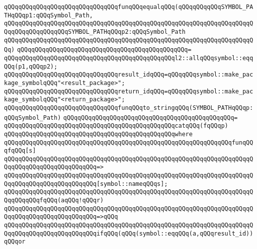 \newline
\verb|qQQqqQQqqQQqqQQqqQQqqQQqqQQqqQQqfunqQQqequalqQQq(qQQqqQQqqQQqSYMBOL_PATHqQQqp1:qQQqSymbol_Path,|\newline
\verb|qQQqqQQqqQQqqQQqqQQqqQQqqQQqqQQqqQQqqQQqqQQqqQQqqQQqqQQqqQQqqQQqqQQqqQQqqQQqqQQqqQQqqQQqSYMBOL_PATHqQQqp2:qQQqSymbol_Path|\newline
\verb|qQQqqQQqqQQqqQQqqQQqqQQqqQQqqQQqqQQqqQQqqQQqqQQqqQQqqQQqqQQqqQQqqQQqqQQq)|\newline
\verb|qQQqqQQqqQQqqQQqqQQqqQQqqQQqqQQqqQQqqQQqqQQqqQQq=|\newline
\verb|qQQqqQQqqQQqqQQqqQQqqQQqqQQqqQQqqQQqqQQqqQQqqQQql2::allqQQqsymbol::eqqQQq(p1,qQQqp2);|\newline
\newline
\verb|qQQqqQQqqQQqqQQqqQQqqQQqqQQqqQQqresult_idqQQq=qQQqqQQqsymbol::make_package_symbolqQQq"<result_package>";|\newline
\verb|qQQqqQQqqQQqqQQqqQQqqQQqqQQqqQQqreturn_idqQQq=qQQqqQQqsymbol::make_package_symbolqQQq"<return_package>";|\newline
\newline
\verb|qQQqqQQqqQQqqQQqqQQqqQQqqQQqqQQqfunqQQqto_stringqQQq(SYMBOL_PATHqQQqp:qQQqSymbol_Path)|\newline
\verb|qQQqqQQqqQQqqQQqqQQqqQQqqQQqqQQqqQQqqQQqqQQqqQQq=|\newline
\verb|qQQqqQQqqQQqqQQqqQQqqQQqqQQqqQQqqQQqqQQqqQQqqQQqcatqQQq(fqQQqp)|\newline
\verb|qQQqqQQqqQQqqQQqqQQqqQQqqQQqqQQqqQQqqQQqqQQqqQQqwhere|\newline
\verb|qQQqqQQqqQQqqQQqqQQqqQQqqQQqqQQqqQQqqQQqqQQqqQQqqQQqqQQqqQQqqQQqfunqQQqfqQQq[s]|\newline
\verb|qQQqqQQqqQQqqQQqqQQqqQQqqQQqqQQqqQQqqQQqqQQqqQQqqQQqqQQqqQQqqQQqqQQqqQQqqQQqqQQqqQQqqQQqqQQqqQQq=>|\newline
\verb|qQQqqQQqqQQqqQQqqQQqqQQqqQQqqQQqqQQqqQQqqQQqqQQqqQQqqQQqqQQqqQQqqQQqqQQqqQQqqQQqqQQqqQQqqQQqqQQq[symbol::nameqQQqs];|\newline
\newline
\verb|qQQqqQQqqQQqqQQqqQQqqQQqqQQqqQQqqQQqqQQqqQQqqQQqqQQqqQQqqQQqqQQqqQQqqQQqqQQqqQQqfqQQq(aqQQq!qQQqr)|\newline
\verb|qQQqqQQqqQQqqQQqqQQqqQQqqQQqqQQqqQQqqQQqqQQqqQQqqQQqqQQqqQQqqQQqqQQqqQQqqQQqqQQqqQQqqQQqqQQqqQQq=>qQQq|\newline
\verb|qQQqqQQqqQQqqQQqqQQqqQQqqQQqqQQqqQQqqQQqqQQqqQQqqQQqqQQqqQQqqQQqqQQqqQQqqQQqqQQqqQQqqQQqqQQqqQQqifqQQq(qQQq(symbol::eqqQQq(a,qQQqresult_id))qQQqor|\newline
